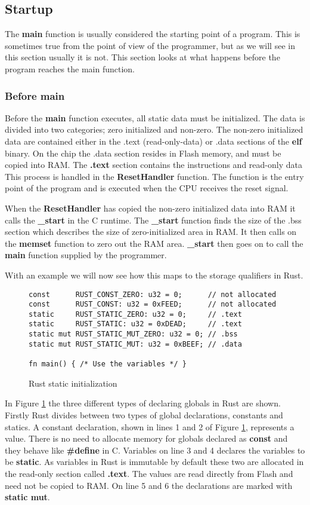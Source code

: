 \subsection{Startup}

The \textbf{main} function is usually considered the starting point of a program.
This is sometimes true from the point of view of the programmer, but as we will see in this section usually it is not.
This section looks at what happens before the program reaches the main function.

\subsubsection{Before main}

Before the \textbf{main} function executes, all static data must be initialized.
The data is divided into two categories; zero initialized and non-zero.
The non-zero initialized data are contained either in the .text (read-only-data) or .data sections of the \textbf{elf} binary.
On the chip the .data section resides in Flash memory, and must be copied into RAM.
The \textbf{.text} section contains the instructions and read-only data 
This process is handled in the \textbf{ResetHandler} function.
The function is the entry point of the program and is executed when the CPU receives the reset signal.

When the \textbf{ResetHandler} has copied the non-zero initialized data into RAM it calls the \textbf{\_start} in the C runtime.
The \textbf{\_start} function finds the size of the .bss section which describes the size of zero-initialized area in RAM.
It then calls on the \textbf{memset} function to zero out the RAM area.
\textbf{\_start} then goes on to call the \textbf{main} function supplied by the programmer.

With an example we will now see how this maps to the storage qualifiers in Rust.
\begin{figure}
\begin{verbatim}
const      RUST_CONST_ZERO: u32 = 0;      // not allocated
const      RUST_CONST: u32 = 0xFEED;      // not allocated
static     RUST_STATIC_ZERO: u32 = 0;     // .text
static     RUST_STATIC: u32 = 0xDEAD;     // .text
static mut RUST_STATIC_MUT_ZERO: u32 = 0; // .bss
static mut RUST_STATIC_MUT: u32 = 0xBEEF; // .data

fn main() { /* Use the variables */ }
\end{verbatim}
\caption{Rust static initialization}
\label{fig:rust-static-init}
\end{figure}
In Figure \ref{fig:rust-static-init} the three different types of declaring globals in Rust are shown.
Firstly Rust divides between two types of global declarations, constants and statics.
A constant declaration, shown in lines 1 and 2 of Figure \ref{fig:rust-static-init}, represents a value.
There is no need to allocate memory for globals declared as \textbf{const} and they behave like \textbf{\#define} in C.
Variables on line 3 and 4 declares the variables to be \textbf{static}.
As variables in Rust is immutable by default these two are allocated in the read-only section called \textbf{.text}.
The values are read directly from Flash and need not be copied to RAM.
On line 5 and 6 the declarations are marked with \textbf{static mut}. 
